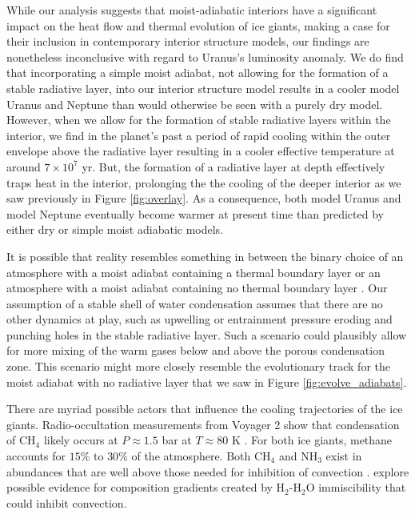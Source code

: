 \documentclass[11pt]{ucscthesisbs}
\begin{document}
While our analysis suggests that moist-adiabatic interiors have a significant impact on the heat flow and thermal evolution of ice giants, making a case for their inclusion in contemporary interior structure models, our findings are nonetheless inconclusive with regard to Uranus's luminosity anomaly. We do find that incorporating a simple moist adiabat, not allowing for the formation of a stable radiative layer, into our interior structure model results in a cooler model Uranus and Neptune than would otherwise be seen with a purely dry model. However, when we allow for the formation of stable radiative layers within the interior, we find in the planet's past a period of rapid cooling within the outer envelope above the radiative layer resulting in a cooler effective temperature at around $7 \times 10^7$ yr. But, the formation of a radiative layer at depth effectively traps heat in the interior, prolonging the the cooling of the deeper interior as we saw previously in Figure \ref{fig:overlay}. As a consequence, both model Uranus and model Neptune eventually become warmer at present time than predicted by either dry or simple moist adiabatic models. 

It is possible that reality resembles something in between the binary choice of an atmosphere with a moist adiabat containing a thermal boundary layer or an atmosphere with a moist adiabat containing no thermal boundary layer \citep{guillot_2019}. Our assumption of a stable shell of water condensation assumes that there are no other dynamics at play, such as upwelling or entrainment pressure \citep{friedson_2017,2019arXiv190802092G} eroding and punching holes in the stable radiative layer. Such a scenario could plausibly allow for more mixing of the warm gases below and above the porous condensation zone. This scenario might more closely resemble the evolutionary track for the moist adiabat with no radiative layer that we saw in Figure \ref{fig:evolve_adiabats}. 

There are myriad possible actors that influence the cooling trajectories of the ice giants. Radio-occultation measurements from Voyager 2 show that condensation of CH$_{4}$ likely occurs at $ P \approx  1.5$ bar at $T \approx 80$ K \citep{1992AJ....103..967L}. For both ice giants, methane accounts for $15\%$ to $30 \%$ of the atmosphere. Both CH$_{4}$ and NH$_{3}$ exist in abundances that are well above those needed for inhibition of convection \citep{2019arXiv190802092G}. \citep{2020arXiv201204166B} explore possible evidence for composition gradients created by H$_{2}$-H$_{2}$O immiscibility that could inhibit convection. 
\end{document}
